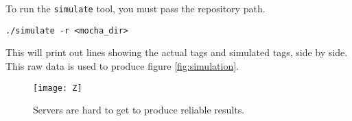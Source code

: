 To run the {\tt simulate} tool, you must pass the repository path.

\begin{center}
  {\tt ./simulate -r <mocha\_dir>}
\end{center}
This will print out lines showing the actual tags and simulated tags,
side by side. This raw data is used to produce figure \ref{fig:simulation}.

\begin{figure}
\centering
\texttt{[image: Z]}
\caption{Servers are hard to get to produce reliable results.}
\label{fig:doge}
\end{figure}

